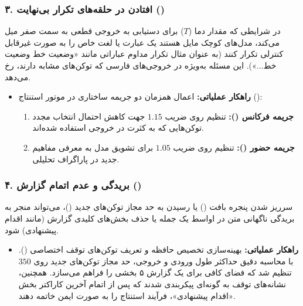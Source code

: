 \documentclass[a4paper, 10pt, twocolumn]{article}
\begin{document}
	\subsubsection{۳. افتادن در حلقه‌های تکرار بی‌نهایت ()}
	در شرایطی که مقدار دما ($T$) برای دستیابی به خروجی قطعی به سمت صفر میل می‌کند، مدل‌های کوچک مایل هستند یک عبارت یا لغت خاص را به صورت غیرقابل کنترلی تکرار کنند (به عنوان مثال تکرار مداوم عباراتی مانند «وضعیت خط وضعیت خط...»). این مسئله به‌ویژه در خروجی‌های فارسی که توکن‌های مشابه دارند، رخ می‌دهد.
	
	\begin{itemize}
		\item \textbf{راهکار عملیاتی:} اعمال همزمان دو جریمه ساختاری در موتور استنتاج ():
		\begin{enumerate}
			\item \textbf{جریمه فرکانس ():} تنظیم روی ضریب $1.15$ جهت کاهش احتمال انتخاب مجدد توکن‌هایی که به کثرت در خروجی استفاده شده‌اند.
			\item \textbf{جریمه حضور ():} تنظیم روی ضریب $1.05$ برای تشویق مدل به معرفی مفاهیم جدید در پاراگراف تحلیلی.
		\end{enumerate}
	\end{itemize}
	
	\subsubsection{۴. بریدگی و عدم اتمام گزارش ()}
	سرریز شدن پنجره بافت () یا رسیدن به حد مجاز توکن‌های جدید ()، می‌تواند منجر به بریدگی ناگهانی متن در اواسط یک جمله یا حذف بخش‌های کلیدی گزارش (مانند اقدام پیشنهادی) شود.
	
	\begin{itemize}
		\item \textbf{راهکار عملیاتی:} بهینه‌سازی تخصیص حافظه و تعریف توکن‌های توقف اختصاصی (). با محاسبه دقیق حداکثر طول ورودی و خروجی، حد مجاز توکن‌های جدید روی $350$ تنظیم شد که فضای کافی برای یک گزارش ۵ بخشی را فراهم می‌سازد. همچنین، نشانه‌های توقف به گونه‌ای پیکربندی شدند که پس از اتمام آخرین کاراکتر بخش «اقدام پیشنهادی»، فرآیند استنتاج را به صورت ایمن خاتمه دهند.
	\end{itemize}
	
\end{document}
